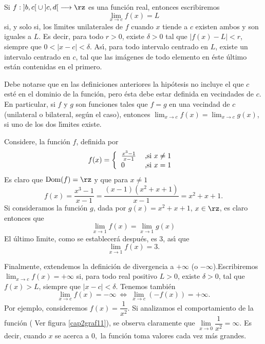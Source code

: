 Si $f:\left]  b,c\right[  \cup\left]  c,d\right[  \longrightarrow\rz$ es una
funci\'{o}n real, entonces escribiremos
\[
\lim_{x\rightarrow c}f(x)=L
\]
si, y solo si, los l\'{\i}mites unilaterales de $f$ cuando $x$ tiende a $c$
existen ambos y son iguales a $L$. Es decir, para todo $r>0$, existe
$\delta>0$ tal que $|f(x)-L|<r$, siempre que $0<|x-c|<\delta$. As\'{\i}, para
todo intervalo centrado en $L$, existe un intervalo centrado en $c$, tal que
las im\'{a}genes de todo elemento en \'{e}ste \'{u}ltimo est\'{a}n contenidas
en el primero.

Debe notarse que en las definiciones anteriores la hip\'{o}tesis no incluye el
que $c$ est\'{e} en el dominio de la funci\'{o}n, pero \'{e}sta debe estar
definida en vecindades de $c$. En particular, si $f$ y $g$ son funciones tales
que $f=g$ en una vecindad de $c$ (unilateral o bilateral, seg\'{u}n el caso),
entonces $\lim_{x\rightarrow c}f(x)=\lim_{x\rightarrow c}g(x)$, si uno de los
dos l\'{\i}mites existe.

\begin{exercise}
Considere, la funci\'{o}n $f$, definida por
\[
f(x)=\left\{
\begin{tabular}
[c]{ll}%
$\frac{x^{3}-1}{x-1}$ & ,si $x\neq1$\\
$0$ & ,si $x=1$%
\end{tabular}
\ \right.
\]
Es claro que $\operatorname*{Dom}(f)=\rz$ y que para $x\neq1$
\[
f(x)=\frac{x^{3}-1}{x-1}=\frac{(x-1)(x^{2}+x+1)}{x-1}=x^{2}+x+1.
\]
Si consideramos la funci\'{o}n $g$, dada por $g(x)=x^{2}+x+1$, $x\in\rz$, es
claro entonces que
\[
\lim_{x\rightarrow1}f(x)=\lim_{x\rightarrow1}g(x)
\]
El \'{u}ltimo l\'{\i}mite, como se establecer\'{a} despu\'{e}s, es $3$,
as\'{\i} que
\[
\lim_{x\rightarrow1}f(x)=3.
\]

\end{exercise}

Finalmente, extendemos la definici\'{o}n de divergencia a $+\infty$ (o
$-\infty$).\newline Escribiremos $\lim_{x\rightarrow c}f(x)=+\infty$ si, para
todo real positivo%
$L>0$, existe $\delta>0$, tal que $f(x)>L$, siempre que $|x-c|<\delta$.
Tenemos tambi\'{e}n
\[
\lim_{x\rightarrow c}f(x)=-\infty\ \Longleftrightarrow\ \lim_{x\rightarrow
c}(-f(x))=+\infty.
\]
Por ejemplo, consideremos $f(x)=\dfrac{1}{x^{2}}.$ Si analizamos el
comportamiento de la funci\'{o}n ( Ver figura \ref{cap2graf11}), se observa
claramente que $\lim\limits_{x\rightarrow0}\dfrac{1}{x^{2}}=\infty.$ Es decir,
cuando $x$ se acerca a $0,$ la funci\'{o}n toma valores cada vez m\'{a}s grandes.

